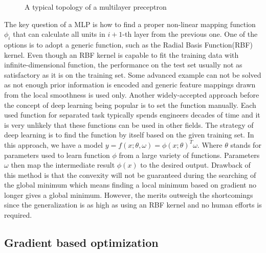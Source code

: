 \begin{figure}[!ht]
    \centering
    \caption[A typical topology of a multilayer preceptron]{A typical topology of a multilayer preceptron}
    \label{lr_fig:ml_mlp_intro}
\end{figure}
%
The key question of a MLP is how to find a proper non-linear mapping function $\phi_i$ that can calculate all units in $i+1$-th layer from the previous one.
One of the options is to adopt a generic function, such as the Radial Basis Function(RBF)\citep{chang2010} kernel.
Even though an RBF kernel is capable to fit the training data with infinite-dimensional function, the performance on the test set usually not as satisfactory as it is on the training set.
Some advanced example can not be solved as not enough prior information is encoded and generic feature mappings drawn from the local smoothness is used only.
Another widely-accepted approach before the concept of deep learning being popular is to set the function manually.
Each used function for separated task typically spends engineers decades of time and it is very unlikely that these functions can be used in other fields.
The strategy of deep learning is to find the function by itself based on the given training set.
In this approach, we have a model $y=f(x;\theta,\omega)=\phi(x;\theta)^T\omega$.
Where $\theta$ stands for parameters used to learn function $\phi$ from a large variety of functions.
Parameters $\omega$ then map the intermediate result $\phi(x)$ to the desired output.
Drawback of this method is that the convexity will not be guaranteed during the searching of the global minimum which means finding a local minimum based on gradient no longer gives a global minimum.
However, the merits outweigh the shortcomings since the generalization is as high as using an RBF kernel and no human efforts is required.

\subsection{Gradient based optimization}
